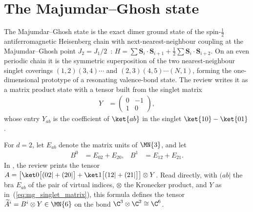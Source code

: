 \section{The Majumdar--Ghosh state}\label{sec:majumdar_ghosh}

The Majumdar--Ghosh state is the exact dimer ground state of the spin-$\tfrac12$
antiferromagnetic Heisenberg chain with next-nearest-neighbour coupling at the
Majumdar--Ghosh point $J_2 = J_1 / 2$~\cite{MajumdarGhosh1969,MajumdarGhosh1969II}:
$H=\sum \boldsymbol{S}_i\cdot\boldsymbol{S}_{i+1}
    +\tfrac12\sum\boldsymbol{S}_i\cdot\boldsymbol{S}_{i+2}$.
On an even periodic chain it is the symmetric superposition of the two
nearest-neighbour singlet coverings $(1,2)(3,4)\cdots$ and
$(2,3)(4,5)\cdots(N,1)$, forming the one-dimensional prototype of a
resonating valence-bond state. The review
\cite[Appendix~A, ``The Majumdar-Ghosh model'']{Cirac2021Matrix} writes it as a
matrix product state with a tensor built from the singlet matrix
\begin{align}
    Y & =
    \begin{pmatrix}
        0 & -1 \\
        1 & 0
    \end{pmatrix},
    \label{eq:mg_singlet_matrix}
\end{align}
whose entry $Y_{ab}$ is the coefficient of $\ket{ab}$ in the singlet
$\ket{10}-\ket{01}$.

\begin{definition}%
    \label{def:majumdar_ghosh_review_tensor}
    \leanok
    For $d=2$, let $E_{ab}$ denote the matrix units of $\MN{3}$, and let
    \begin{align}
        B^0 & = E_{02}+E_{20},
            & B^1              & = E_{12}+E_{21}.
        \label{eq:mg_review_bond}
    \end{align}
    In \cite[Appendix~A, ``The Majumdar-Ghosh model'']{Cirac2021Matrix}, the
    review prints the tensor
    $A=\bigl[\ket0{\bigl[(02|+(20|\bigr]}+\ket1{\bigl[(12|+(21|\bigr]}\bigr]\otimes Y$.
    Read directly, with $(ab|$ the bra $E_{ab}$ of the pair of virtual indices,
    $\otimes$ the Kronecker product, and $Y$ as in~(\ref{eq:mg_singlet_matrix}),
    this formula defines the tensor
    $\widetilde A^i=B^i\otimes Y\in\MN{6}$ on the bond
    $\C^3\otimes\C^2\cong\C^6$.
\end{definition}

